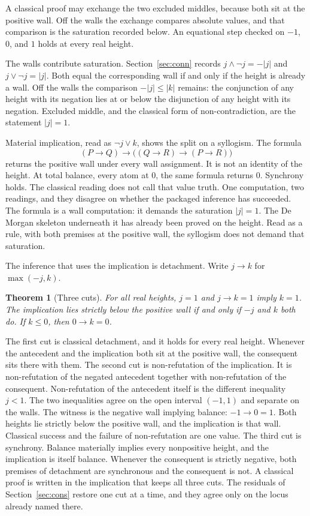 \documentclass[a4paper]{article}
\newtheorem{theorem}{Theorem}[section]
\theoremstyle{definition}
\begin{document}
A classical proof may exchange the two excluded middles, because both
sit at the positive wall. Off the walls the exchange compares absolute
values, and that comparison is the saturation recorded below. An
equational step checked on \(-1\), \(0\), and \(1\) holds at every real
height.

The walls contribute saturation.
Section~\ref{sec:conn} records \(j\wedge\neg j=-|j|\) and
\(j\vee\neg j=|j|\). Both equal the corresponding wall if and only if
the height is already a wall. Off the walls the comparison
\(-|j|\le|k|\) remains: the conjunction of any height with its negation
lies at or below the disjunction of any height with its negation.
Excluded middle, and the classical form of non-contradiction, are the
statement \(|j|=1\).

Material implication, read as \(\neg j\vee k\), shows the split on a
syllogism. The formula
\[
(P\to Q)\to\bigl((Q\to R)\to(P\to R)\bigr)
\]
returns the positive wall under every wall assignment. It is not an
identity of the height. At total balance, every atom at \(0\), the same
formula returns \(0\). Synchrony holds. The classical reading does not
call that value truth. One computation, two readings, and they disagree
on whether the packaged inference has succeeded. The formula is a wall
computation: it demands the saturation \(|j|=1\). The De Morgan
skeleton underneath it has already been proved on the height. Read as
a rule, with both premises at the positive wall, the syllogism does
not demand that saturation.

The inference that uses the implication is detachment. Write \(j\to k\)
for \(\max(-j,k)\).

\begin{theorem}[Three cuts]
\label{thm:detach}
For all real heights, \(j=1\) and \(j\to k=1\) imply \(k=1\). The
implication lies strictly below the positive wall if and only if \(-j\)
and \(k\) both do. If \(k\le 0\), then \(0\to k=0\).
\end{theorem}

The first cut is classical detachment, and it holds for every real
height. Whenever the antecedent and the implication both sit at the
positive wall, the consequent sits there with them. The second cut is
non-refutation of the implication. It is non-refutation of the negated
antecedent together with non-refutation of the consequent.
Non-refutation of the antecedent itself is the different inequality
\(j<1\). The two inequalities agree on the open interval \((-1,1)\) and
separate on the walls. The witness is the negative wall implying
balance: \(-1\to 0=1\). Both heights lie strictly below the positive
wall, and the implication is that wall. Classical success and the
failure of non-refutation are one value. The third cut is synchrony.
Balance materially implies every nonpositive height, and the
implication is itself balance. Whenever the consequent is strictly
negative, both premises of detachment are synchronous and the
consequent is not. A classical
proof is written in the implication that keeps all three cuts. The
residuals of Section~\ref{sec:cons} restore one cut at a time, and they
agree only on the locus already named there.
\end{document}
